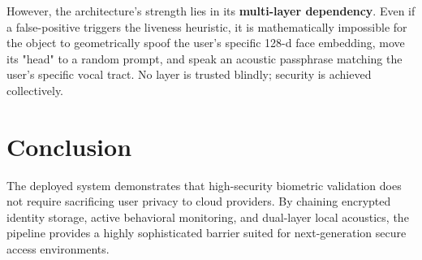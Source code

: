 \documentclass[11pt, a4paper]{article}
\begin{document}
However, the architecture's strength lies in its \textbf{multi-layer dependency}. Even if a false-positive triggers the liveness heuristic, it is mathematically impossible for the object to geometrically spoof the user's specific 128-d face embedding, move its "head" to a random prompt, and speak an acoustic passphrase matching the user's specific vocal tract. No layer is trusted blindly; security is achieved collectively.

\section{Conclusion}
The deployed system demonstrates that high-security biometric validation does not require sacrificing user privacy to cloud providers. By chaining encrypted identity storage, active behavioral monitoring, and dual-layer local acoustics, the pipeline provides a highly sophisticated barrier suited for next-generation secure access environments.
\end{document}
